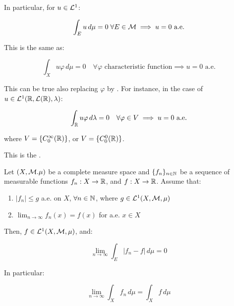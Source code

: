 \begin{fremark}
    In particular, for $u \in \mathcal{L}^1$:

    $$\int_{E} u \, d\mu = 0 \; \forall E \in \mathcal{M} \implies u = 0 \text{ a.e.}$$ 

    This is the same as:

    $$\int_{X} u \varphi \, d\mu = 0 \quad \forall \varphi \text{ characteristic function} \implies u = 0 \text{ a.e.}$$

    This can be true also replacing $\varphi$ by . For
    instance, in the case of $u \in \mathcal{L}^1(\mathbb{R}, \mathcal{L}(\mathbb{R}), \lambda)$:

    $$\int_{\mathbb{R}} u \varphi \, d\lambda = 0 \quad \forall \varphi \in V \implies u = 0 \text{ a.e.}$$

    where $V = \{C_0^{\infty}(\mathbb{R})\}$, or
    $V = \{C_0^0(\mathbb{R})\}$.

    This is the .

\end{fremark}

\vspace{1em}

\begin{ftheorem}
    Let $(X, \mathcal{M}. \mu)$ be a complete measure space and $\{f_n\}_{n \in \mathbb{N}}$ be 
    a sequence of measurable functions $f_n: X \to \mathbb{R}$,
    and $f: X \to \mathbb{R}$. Assume that:
    \vspace{1em}
    \begin{enumerate}[label=(\roman*)]
        \item $|f_n| \leq g$ a.e. on $X$, $\forall n \in \mathbb{N}$, where $g \in \mathcal{L}^1(X, \mathcal{M}, \mu)$
        \vspace{1em}
        \item $\lim_{n \to \infty} f_n(x) = f(x)$ for a.e. $x \in X$
        \vspace{1em}
    \end{enumerate}

    Then, $f \in \mathcal{L}^1(X, \mathcal{M}, \mu)$, and:

    $$\lim_{n \to \infty} \int_{E} |f_n - f| \, d\mu = 0$$

    In particular:

    $$\lim_{n \to \infty} \int_{X} f_n \, d\mu = \int_{X} f \, d\mu$$
    
\end{ftheorem}

